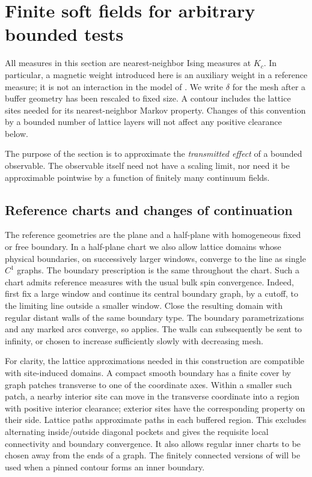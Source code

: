 \section{Finite soft fields for arbitrary bounded tests}
\label{sec:buffers}

All measures in this section are nearest-neighbor Ising measures at
$K_c$.  In particular, a magnetic weight introduced here is an auxiliary
weight in a reference measure; it is not an interaction in the model of
.  We write $\delta$ for the mesh after a buffer geometry
has been rescaled to fixed size.  A contour includes the lattice sites
needed for its nearest-neighbor Markov property.  Changes of this
convention by a bounded number of lattice layers will not affect any
positive clearance below.

The purpose of the section is to approximate the \emph{transmitted
effect} of a bounded observable.  The observable itself need not have a
scaling limit, nor need it be approximable pointwise by a function of
finitely many continuum fields.

\subsection{Reference charts and changes of continuation}

The reference geometries are the plane and a half-plane with homogeneous
fixed or free boundary.  In a half-plane chart we also allow lattice
domains whose physical boundaries, on successively larger windows,
converge to the line as single $C^1$ graphs.  The boundary prescription
is the same throughout the chart.  Such a chart admits reference
measures with the usual bulk spin convergence.  Indeed, first fix a
large window and continue its central boundary graph, by a cutoff, to
the limiting line outside a smaller window.  Close the resulting domain
with regular distant walls of the same boundary type.  The boundary
parametrizations and any marked arcs converge, so 
applies.  The walls can subsequently be sent to infinity, or chosen to
increase sufficiently slowly with decreasing mesh.

For clarity, the lattice approximations needed in this construction
are compatible with site-induced domains.  A compact smooth boundary
has a finite cover by graph patches transverse to one of the coordinate
axes.  Within a smaller such patch, a nearby interior site can move in
the transverse coordinate into a region with positive interior
clearance; exterior sites have the corresponding property on their
side.  Lattice paths approximate paths in each buffered region.
This excludes alternating inside/outside diagonal pockets and gives
the requisite local connectivity and boundary convergence.  It also
allows regular inner charts to be chosen away from the ends of a
graph.  The finitely connected versions of  will be used
when a pinned contour forms an inner boundary.

